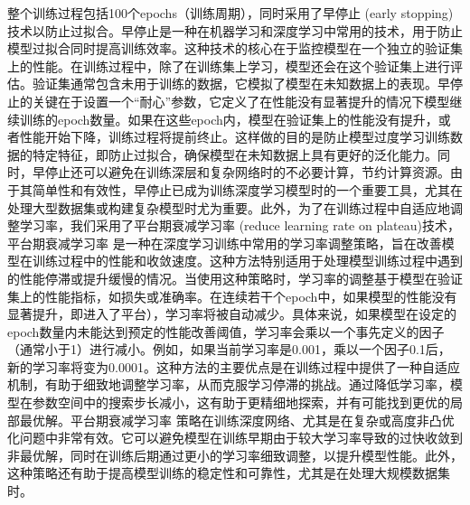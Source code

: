 整个训练过程包括100个epochs（训练周期），同时采用了早停止 (early stopping)技术以防止过拟合。早停止是一种在机器学习和深度学习中常用的技术，用于防止模型过拟合同时提高训练效率。这种技术的核心在于监控模型在一个独立的验证集上的性能。在训练过程中，除了在训练集上学习，模型还会在这个验证集上进行评估。验证集通常包含未用于训练的数据，它模拟了模型在未知数据上的表现。早停止的关键在于设置一个“耐心”参数，它定义了在性能没有显著提升的情况下模型继续训练的epoch数量。如果在这些epoch内，模型在验证集上的性能没有提升，或者性能开始下降，训练过程将提前终止。这样做的目的是防止模型过度学习训练数据的特定特征，即防止过拟合，确保模型在未知数据上具有更好的泛化能力。同时，早停止还可以避免在训练深层和复杂网络时的不必要计算，节约计算资源。由于其简单性和有效性，早停止已成为训练深度学习模型时的一个重要工具，尤其在处理大型数据集或构建复杂模型时尤为重要。此外，为了在训练过程中自适应地调整学习率，我们采用了平台期衰减学习率 (reduce learning rate on plateau)技术，平台期衰减学习率 是一种在深度学习训练中常用的学习率调整策略，旨在改善模型在训练过程中的性能和收敛速度。这种方法特别适用于处理模型训练过程中遇到的性能停滞或提升缓慢的情况。当使用这种策略时，学习率的调整基于模型在验证集上的性能指标，如损失或准确率。在连续若干个epoch中，如果模型的性能没有显著提升，即进入了平台），学习率将被自动减少。具体来说，如果模型在设定的epoch数量内未能达到预定的性能改善阈值，学习率会乘以一个事先定义的因子（通常小于1）进行减小。例如，如果当前学习率是0.001，乘以一个因子0.1后，新的学习率将变为0.0001。这种方法的主要优点是在训练过程中提供了一种自适应机制，有助于细致地调整学习率，从而克服学习停滞的挑战。通过降低学习率，模型在参数空间中的搜索步长减小，这有助于更精细地探索，并有可能找到更优的局部最优解。平台期衰减学习率 策略在训练深度网络、尤其是在复杂或高度非凸优化问题中非常有效。它可以避免模型在训练早期由于较大学习率导致的过快收敛到非最优解，同时在训练后期通过更小的学习率细致调整，以提升模型性能。此外，这种策略还有助于提高模型训练的稳定性和可靠性，尤其是在处理大规模数据集时。

